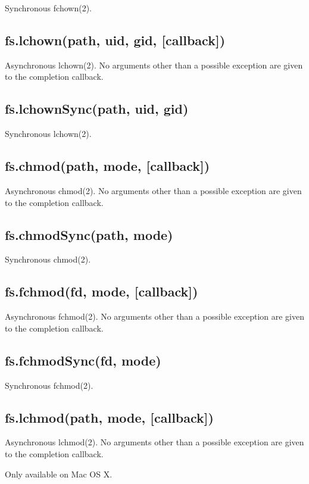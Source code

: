 Synchronous fchown(2).

\subsection{fs.lchown(path, uid, gid, {[}callback{]})}

Asynchronous lchown(2). No arguments other than a possible exception are
given to the completion callback.

\subsection{fs.lchownSync(path, uid, gid)}

Synchronous lchown(2).

\subsection{fs.chmod(path, mode, {[}callback{]})}

Asynchronous chmod(2). No arguments other than a possible exception are
given to the completion callback.

\subsection{fs.chmodSync(path, mode)}

Synchronous chmod(2).

\subsection{fs.fchmod(fd, mode, {[}callback{]})}

Asynchronous fchmod(2). No arguments other than a possible exception are
given to the completion callback.

\subsection{fs.fchmodSync(fd, mode)}

Synchronous fchmod(2).

\subsection{fs.lchmod(path, mode, {[}callback{]})}

Asynchronous lchmod(2). No arguments other than a possible exception are
given to the completion callback.

Only available on Mac OS X.

